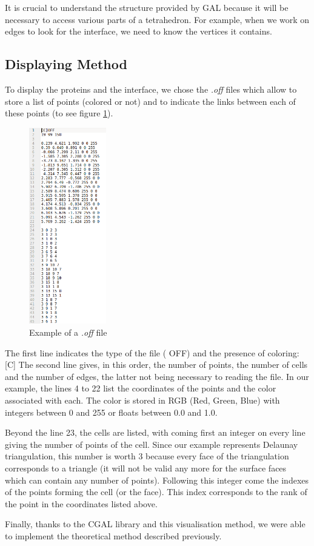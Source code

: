 It is crucial to understand the structure provided by GAL because it will be
 necessary to access various parts of a tetrahedron. For example, when we work on
 edges to look for the interface, we need to know the vertices it contains.

\subsection{Displaying Method}

To display the proteins and the interface, we chose the \textit{.off } files
 which allow to store a list of points (colored or not) and to indicate the links between
  each of these points (to see figure \ref{fig::off_file}).

\begin{figure}[ht]
\centering
  \includegraphics[width=0.3\textwidth]{figures/off_file.png}
  \caption{Example of a \textit{.off} file}
  \label{fig::off_file}
\end{figure}

The first line indicates the type of the file ( OFF) and the presence of coloring: [C]
The second line gives, in this order, the number of
 points, the number of cells and the number of edges, the
 latter not being necessary to reading the file. In our example, the lines 4 to 22
  list the coordinates of the points and the color associated with each.
  The color is stored in RGB (Red, Green, Blue) with integers between 0 and 255 or
   floats between 0.0 and 1.0.

Beyond the line 23, the cells are listed, with coming first an integer on every line giving
 the number of points of the cell. Since our example represents Delaunay triangulation,
 this number is worth 3 because every face of the triangulation corresponds
  to a triangle (it will not be valid any more for the surface faces which can contain
   any number of points). Following this integer come the indexes of the points forming
    the cell (or the face). This index corresponds to the rank of the point in the coordinates
     listed above.

     Finally, thanks to the CGAL library and this visualisation method, we were able
     to implement the theoretical method described previously.
